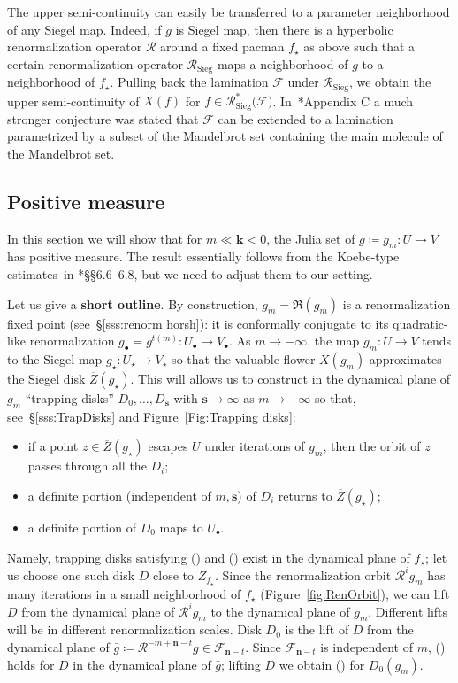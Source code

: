 \documentclass{amsart}
\newcommand{\1}{{\mathbb 1 }}
\newcommand\RRR{{\mathfrak R}}
\newcommand\RR{\mathcal{R}}
\newcommand{\bbn}{{\mathbf n}}
\newcommand{\bbk}{{\mathbf k}}
\newcommand{\bbs}{{\mathbf s}}
\newcommand{\str}{{\star}}
\newcommand\Sieg{{\operatorname{Sieg}}}
\newcommand{\bFol}{{\boldsymbol{ \mathcal F}}}
\theoremstyle{remark}
\numberwithin{equation}{section}
\theoremstyle{definition}
\newcommand{\RN}[1]{\MakeUppercase{\romannumeral#1}}%
\theoremstyle{nonumberbreak}
\begin{document}
The upper semi-continuity can easily be transferred to a parameter neighborhood of any Siegel map. Indeed, if $g$ is Siegel map, then there is a hyperbolic renormalization operator $\RR$ around a fixed pacman $f_\str$ as above such that a certain renormalization operator $\RR_\Sieg$ maps a neighborhood of $g$ to a neighborhood of $f_\str$. Pulling back the lamination $\bFol$ under $\RR_\Sieg$, we obtain the upper semi-continuity of $X(f)$ for $f\in \RR_\Sieg^* \big(  \bFol \big)$. In~\cite{DLS}*{Appendix C} a much stronger conjecture was stated that $\bFol$ can be extended to a lamination parametrized by a subset of the Mandelbrot set containing the main molecule of the Mandelbrot set. 

\subsection{Positive measure}
\label{ss:PositArea}
In this section we will show that for $m\ll \bbk<0$, the Julia set of $g\coloneqq g_m\colon U\to V$ has positive measure. The result essentially follows from the Koebe-type estimates~in \cite{AL-posmeas}*{\S\S6.6--6.8}, but we need to adjust them to our setting.

 Let us give a {\bf short outline}. By construction, $g_m=\RRR(g_m)$ is a renormalization fixed point (see~\S\ref{sss:renorm horsh}): it is conformally conjugate to its quadratic-like renormalization $g_\bullet = g^{t(m)}\colon U_\bullet \to V_\bullet$. As $m\to -\infty$, the map $g_m\colon  U\to V$ tends to the Siegel map $g_\str\colon U_\str\to V_\str$ so that the valuable flower $X(g_m)$ approximates the Siegel disk $\overline Z(g_\str)$. This will allows us to construct in the dynamical plane of $g_m$ ``trapping disks'' $D_0,\dots, D_\bbs$ with $\bbs\to \infty$ as $m\to -\infty$ so that, see~\S\ref{sss:TrapDisks} and Figure~\ref{Fig:Trapping disks}:
\begin{itemize}
\item[(\RN{1})] if a point $z\in \overline Z(g_\str)$ escapes $U$ under iterations of $g_m$, then the orbit of $z$ passes through all the $D_i$;
\item[(\RN{2})] a definite portion (independent of $m,\bbs$) of $D_i$ returns to $\overline Z(g_\str)$;
\item[(\RN{3})] a definite portion of $D_0$ maps to $U_\bullet$. 
\end{itemize}
Namely, trapping disks satisfying (\RN{1}) and (\RN{2}) exist in the dynamical plane of $f_\str$; let us choose one such disk $D$ close to $Z_{f_\str}$. Since the renormalization orbit $\RR^i g_m$ has many iterations in a small neighborhood of $f_\str$ (Figure~\ref{fig:RenOrbit}), we can lift $D$ from the dynamical plane of $\RR^i g_m$ to the dynamical plane of $g_m$. Different lifts will be in different renormalization scales. Disk $D_0$ is the lift of $D$ from the dynamical plane of $\bar g\coloneqq \RR^{-m+\bbn-t} g\in \bFol_{\bbn -t}$. Since $ \bFol_{\bbn -t}$ is independent of $m$, (\RN{3}) holds for $D$ in the dynamical plane of $\bar g$; lifting $D$ we obtain (\RN{3}) for $D_0(g_m)$. 
\end{document}
